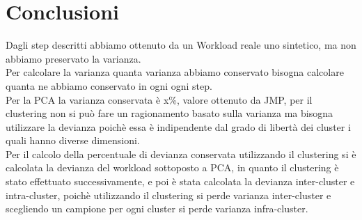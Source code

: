\section{Conclusioni}
Dagli step descritti abbiamo ottenuto da un Workload reale uno sintetico,
ma non abbiamo preservato la varianza.\\
Per calcolare la varianza quanta varianza abbiamo conservato bisogna calcolare quanta
ne abbiamo conservato in ogni ogni step.\\
Per la PCA la varianza conservata è x\%, valore ottenuto da JMP, per il clustering
non si può fare un ragionamento basato sulla varianza ma bisogna utilizzare la devianza
poichè essa è indipendente dal grado di libertà dei cluster i quali hanno diverse
dimensioni.\\
Per il calcolo della percentuale di devianza conservata utilizzando il clustering
si è calcolata la devianza del workload sottoposto a PCA, in quanto il clustering è stato
effettuato successivamente, e poi è stata calcolata la devianza inter-cluster e intra-cluster,
poichè utilizzando il clustering si perde varianza inter-cluster e scegliendo un campione per
ogni cluster si perde varianza infra-cluster.
